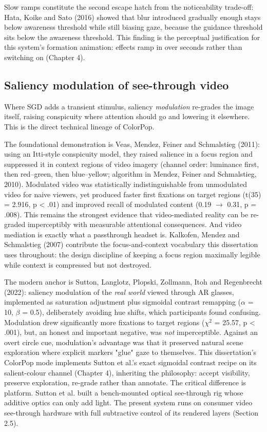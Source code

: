 Slow ramps constitute the second escape hatch from the noticeability trade-off: Hata, Koike and Sato
(2016) showed that blur introduced gradually enough stays below awareness threshold while still
biasing gaze, because the guidance threshold sits below the awareness threshold. This finding is the
perceptual justification for this system's formation animation: effects ramp in over seconds rather
than switching on (Chapter 4).

\subsection{Saliency modulation of see-through video}

Where SGD adds a transient stimulus, saliency \textit{modulation} re-grades the image itself, raising
conspicuity where attention should go and lowering it elsewhere. This is the direct technical
lineage of ColorPop.

The foundational demonstration is Veas, Mendez, Feiner and Schmalstieg (2011): using an Itti-style
conspicuity model, they raised salience in a focus region and suppressed it in context regions of
video imagery (channel order: luminance first, then red–green, then blue–yellow; algorithm in Mendez,
Feiner and Schmalstieg, 2010). Modulated video was statistically indistinguishable from unmodulated
video for naive viewers, yet produced faster first fixations on target regions (t(35) = 2.916,
p < .01) and improved recall of modulated content (0.19 $\rightarrow$ 0.31, p = .008). This remains the strongest
evidence that video-mediated reality can be re-graded imperceptibly with measurable attentional
consequences. And video mediation is exactly what a passthrough headset is. Kalkofen, Mendez and
Schmalstieg (2007) contribute the focus-and-context vocabulary this dissertation uses throughout:
the design discipline of keeping a focus region maximally legible while context is compressed but
not destroyed.

The modern anchor is Sutton, Langlotz, Plopski, Zollmann, Itoh and Regenbrecht (2022): saliency
modulation of the \textit{real world} viewed through AR glasses, implemented as saturation adjustment plus
sigmoidal contrast remapping ($\alpha$ = 10, $\beta$ = 0.5), deliberately avoiding hue shifts, which participants
found confusing. Modulation drew significantly more fixations to target regions ($\chi^2$ = 25.57,
p < .001), but, an honest and important negative, was \textit{not} imperceptible. Against an overt circle
cue, modulation's advantage was that it preserved natural scene exploration where explicit markers
"glue" gaze to themselves. This dissertation's ColorPop mode implements Sutton et al.'s exact
sigmoidal contrast recipe on its salient-colour channel (Chapter 4), inheriting the philosophy:
accept visibility, preserve exploration, re-grade rather than annotate. The critical difference is
platform. Sutton et al. built a bench-mounted optical see-through rig whose additive optics can only
add light. The present system runs on consumer video see-through hardware with full subtractive
control of its rendered layers (Section 2.5).

